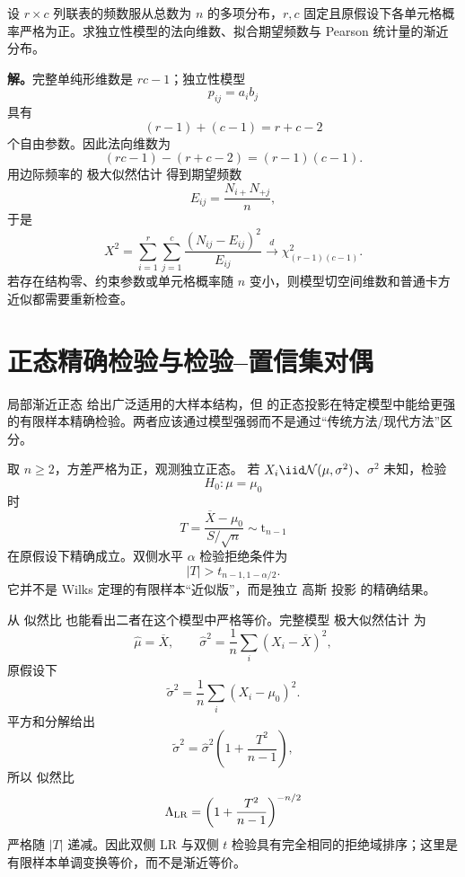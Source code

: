 \begin{workedexample}[列联表独立性的法向维数]
设 $r\times c$ 列联表的频数服从总数为 $n$ 的多项分布，$r,c$ 固定且原假设下各单元格概率严格为正。求独立性模型的法向维数、拟合期望频数与 Pearson 统计量的渐近分布。

\textbf{解。}完整单纯形维数是 $rc-1$；独立性模型
\[
 p_{ij}=a_ib_j
\]
具有
\[
 (r-1)+(c-1)=r+c-2
\]
个自由参数。因此法向维数为
\[
 (rc-1)-(r+c-2)=(r-1)(c-1).
\]
用边际频率的 极大似然估计 得到期望频数
\[
 E_{ij}=\frac{N_{i+}N_{+j}}{n},
\]
于是
\begin{equation*}X^2
 =\sum_{i=1}^r\sum_{j=1}^c
 \frac{(N_{ij}-E_{ij})^2}{E_{ij}}
 \xrightarrow{d}\chi^2_{(r-1)(c-1)}.
\end{equation*}
若存在结构零、约束参数或单元格概率随 $n$ 变小，则模型切空间维数和普通卡方近似都需要重新检查。
\end{workedexample}

\section{正态精确检验与检验--置信集对偶}

局部渐近正态 给出广泛适用的大样本结构，但  的正态投影在特定模型中能给更强的有限样本精确检验。两者应该通过模型强弱而不是通过“传统方法/现代方法”区分。

\begin{proposition}
取 $n\ge2$，方差严格为正，观测独立正态。
若 $X_i\iid\mathcal N(\mu,\sigma^2)$、$\sigma^2$ 未知，检验
\[
 H_0:\mu=\mu_0
\]
时
\[
 T
 =\frac{\overline X-\mu_0}{S/\sqrt n}
 \sim\mathrm t_{n-1}
\]
在原假设下精确成立。双侧水平 $\alpha$ 检验拒绝条件为
\[
 |T|>t_{n-1,1-\alpha/2}.
\]
它并不是 Wilks 定理的有限样本“近似版”，而是独立 高斯 投影 的精确结果。

从 似然比 也能看出二者在这个模型中严格等价。完整模型 极大似然估计 为
\[
 \widehat\mu=\overline X,
 \qquad
 \widehat\sigma^2=\frac1n\sum_i(X_i-\overline X)^2,
\]
原假设下
\[
 \widetilde\sigma^2=\frac1n\sum_i(X_i-\mu_0)^2.
\]
平方和分解给出
\[
 \widetilde\sigma^2
 =\widehat\sigma^2
 \left(1+\frac{T^2}{n-1}\right),
\]
所以 似然比
\[
 \Lambda_{\rm LR}
 =\left(
 1+\frac{T^2}{n-1}
 \right)^{-n/2}
\]
严格随 $|T|$ 递减。因此双侧 LR 与双侧 $t$ 检验具有完全相同的拒绝域排序；这里是有限样本单调变换等价，而不是渐近等价。
\end{proposition}

